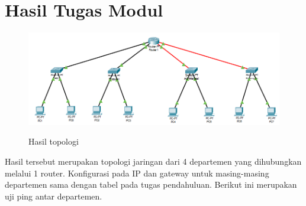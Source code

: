 \section{Hasil Tugas Modul}
\begin{figure}[H]
    \centering
    \includegraphics[width=0.65\linewidth]{image/topologi.png}
    \label{fig:inirujukan}
    \caption{Hasil topologi}
\end{figure}
Hasil tersebut merupakan topologi jaringan dari 4 departemen yang dihubungkan melalui 1 router. Konfigurasi pada IP dan gateway untuk masing-masing departemen sama dengan tabel pada tugas pendahuluan. Berikut ini merupakan uji ping antar departemen. 
